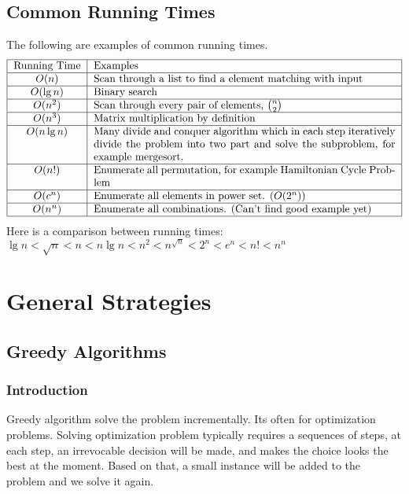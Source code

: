 		\section{Common Running Times}
			The following are examples of common running times.
			\begin{align*}
				\centering
				\begin{tabular}{|c|p{10cm}|}
					\hline
					Running Time & Examples\\
					\hline
					$O(n)$ & Scan through a list to find a element matching with input\\
					\hline
					$O(\lg n)$ & Binary search\\
					\hline
					$O(n^2)$ & Scan through every pair of elements, $\binom{n}{2}$\\
					\hline
					$O(n^3)$ & Matrix multiplication by definition\\
					\hline
					$O(n\lg n)$ & Many divide and conquer algorithm which in each step iteratively divide the problem into two part and solve the subproblem, for example mergesort.\\
					\hline
					$O(n!)$ & Enumerate all permutation, for example Hamiltonian Cycle Problem\\
					\hline
					$O(c^n)$ & Enumerate all elements in power set. ($O(2^n)$)\\
					\hline
					$O(n^n)$ & Enumerate all combinations. (Can't find good example yet)\\
					\hline
				\end{tabular}
			\end{align*}
			Here is a comparison between running times: $\lg n < \sqrt{n} < n < n\lg n < n^2 < n^{\sqrt{n}} < 2^n < e^n < n! < n^n$

	\chapter{General Strategies}
		\section{Greedy Algorithms}
			\subsection{Introduction}
				Greedy algorithm solve the problem incrementally. Its often for optimization problems. Solving optimization problem typically requires a sequences of steps, at each step, an irrevocable decision will be made, and makes the choice looks the best at the moment. Based on that, a small instance will be added to the problem and we solve it again.


